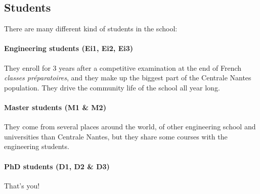 \subsection{Students}
There are many different kind of students in the school:
\paragraph{Engineering students (Ei1, Ei2, Ei3)} They enroll for 3 years after a competitive examination at the end of French \textit{classes préparatoires}, and they make up the biggest part of the Centrale Nantes population. They drive the community life of the school all year long. %
\paragraph{Master students (M1 \& M2)} They come from several places around the world, of other engineering school and universities than Centrale Nantes, but they share some courses with the engineering students. %
\paragraph{PhD students (D1, D2 \& D3)} That's you!

